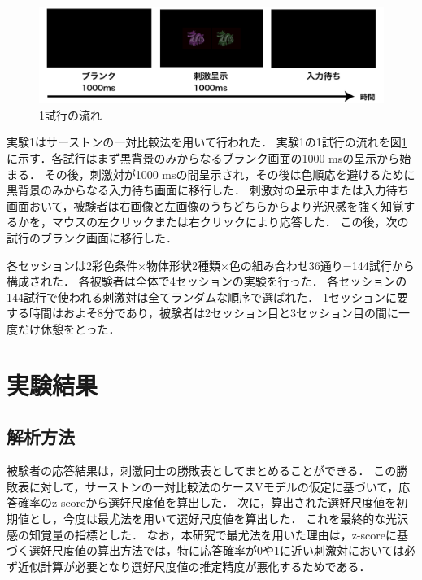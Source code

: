             \begin{figure}[h]
                \centering
                \includegraphics[width=14.0cm]{./img/ex1_procedure.png}
                \caption{1試行の流れ}
                \label{ex1_procedure}
            \end{figure}

            実験1はサーストンの一対比較法を用いて行われた．
            実験1の1試行の流れを図\ref{ex1_procedure}に示す．各試行はまず黒背景のみからなるブランク画面の1000 msの呈示から始まる．
            その後，刺激対が1000 msの間呈示され，その後は色順応を避けるために黒背景のみからなる入力待ち画面に移行した．
            刺激対の呈示中または入力待ち画面おいて，被験者は右画像と左画像のうちどちらからより光沢感を強く知覚するかを，マウスの左クリックまたは右クリックにより応答した．
            この後，次の試行のブランク画面に移行した．

            各セッションは2彩色条件$\times$物体形状2種類$\times$色の組み合わせ36通り=144試行から構成された．
            各被験者は全体で4セッションの実験を行った．
            各セッションの144試行で使われる刺激対は全てランダムな順序で選ばれた．
            1セッションに要する時間はおよそ8分であり，被験者は2セッション目と3セッション目の間に一度だけ休憩をとった．



    \section{実験結果}
        \subsection{解析方法}
            被験者の応答結果は，刺激同士の勝敗表としてまとめることができる．
            この勝敗表に対して，サーストンの一対比較法のケースVモデルの仮定に基づいて，応答確率のz-scoreから選好尺度値を算出した．
            次に，算出された選好尺度値を初期値とし，今度は最尤法を用いて選好尺度値を算出した．
            これを最終的な光沢感の知覚量の指標とした．
            なお，本研究で最尤法を用いた理由は，z-scoreに基づく選好尺度値の算出方法では，特に応答確率が0や1に近い刺激対においては必ず近似計算が必要となり選好尺度値の推定精度が悪化するためである．
            
